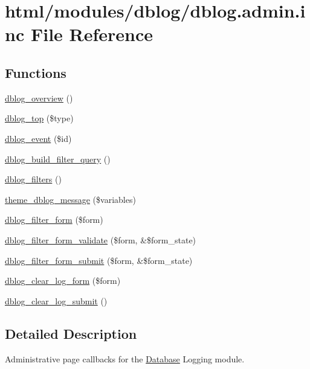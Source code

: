 \hypertarget{dblog_8admin_8inc}{
\section{html/modules/dblog/dblog.admin.inc File Reference}
\label{dblog_8admin_8inc}
}
\subsection*{Functions}
\begin{DoxyCompactItemize}
\item 
\hyperlink{group__logging__severity__levels_ga3b74d083df84c683ed01c7a5468eee12}{dblog\_\-overview} ()
\item 
\hyperlink{dblog_8admin_8inc_af0e96daec46eb718e54a9adde8ec9ce1}{dblog\_\-top} (\$type)
\item 
\hyperlink{dblog_8admin_8inc_a044370b32b7cc5cace449cb62bf6c007}{dblog\_\-event} (\$id)
\item 
\hyperlink{dblog_8admin_8inc_aaeb52aeee42e8fe89e517a509ee30b19}{dblog\_\-build\_\-filter\_\-query} ()
\item 
\hyperlink{dblog_8admin_8inc_a7f01185081208827159e2cf7546acb83}{dblog\_\-filters} ()
\item 
\hyperlink{group__themeable_ga4f279aabc6c186be3cf3a04b6bb94f8a}{theme\_\-dblog\_\-message} (\$variables)
\item 
\hyperlink{group__forms_ga1baa51b833eb4a3831b4319d4c20ad19}{dblog\_\-filter\_\-form} (\$form)
\item 
\hyperlink{dblog_8admin_8inc_a8f88e6f1bf9010761546bbad59189b0f}{dblog\_\-filter\_\-form\_\-validate} (\$form, \&\$form\_\-state)
\item 
\hyperlink{dblog_8admin_8inc_a817953760089fe9caf59d187d3784433}{dblog\_\-filter\_\-form\_\-submit} (\$form, \&\$form\_\-state)
\item 
\hyperlink{group__forms_gad4ec60fb6fd40f5ae8691709f2b9affb}{dblog\_\-clear\_\-log\_\-form} (\$form)
\item 
\hyperlink{dblog_8admin_8inc_aaac30c26ee5c21e148bd0783855f2a87}{dblog\_\-clear\_\-log\_\-submit} ()
\end{DoxyCompactItemize}


\subsection{Detailed Description}
Administrative page callbacks for the \hyperlink{classDatabase}{Database} Logging module. 

